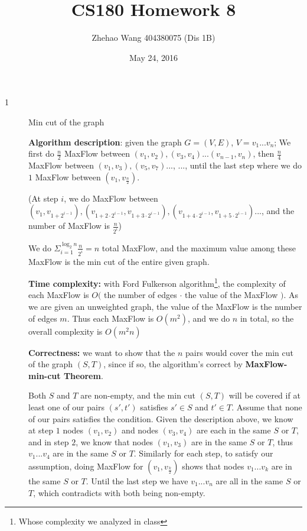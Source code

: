 \documentclass{article}
\title{CS180 Homework 8}
\author{Zhehao Wang 404380075 (Dis 1B)}
\date{May 24, 2016}
\begin{document}
\maketitle

\begin{description}

\item[1]{Min cut of the graph}
  
  \textbf{Algorithm description}: given the graph $G = (V, E)$, $V=v_1...v_n$; We first do $\frac{n}{2}$ MaxFlow between $(v_1, v_2), (v_3, v_4)...(v_{n-1}, v_n)$, then $\frac{n}{4}$ MaxFlow between $(v_1, v_3), (v_5, v_7)...$, ..., until the last step where we do $1$ MaxFlow between $(v_1, v_{\frac{n}{2}})$. 

  (At step $i$, we do MaxFlow between $(v_1, v_{1 + 2^{i - 1}}), (v_{1 + 2 \cdot 2^{i - 1}}, v_{1 + 3 \cdot 2^{i - 1}}), (v_{1 + 4 \cdot 2^{i - 1}}, v_{1 + 5 \cdot 2^{i - 1}})...$, and the number of MaxFlow is $\frac{n}{2^i}$)

  We do $\Sigma_{i=1}^{\log_{2}{n}}{\frac{n}{2^i}} = n$ total MaxFlow, and the maximum value among these MaxFlow is the min cut of the entire given graph.
  
  \textbf{Time complexity:} with Ford Fulkerson algorithm\footnote{Whose complexity we analyzed in class}, the complexity of each MaxFlow is $O($ the number of edges $\cdot$ the value of the MaxFlow $)$. As we are given an unweighted graph, the value of the MaxFlow is the number of edges $m$. Thus each MaxFlow is $O(m^2)$, and we do $n$ in total, so the overall complexity is $O(m^2 n)$

  \textbf{Correctness:} we want to show that the $n$ pairs would cover the min cut of the graph $(S, T)$, since if so, the algorithm's correct by \textbf{MaxFlow-min-cut Theorem}.

  Both $S$ and $T$ are non-empty, and the min cut $(S, T)$ will be covered if at least one of our pairs $(s', t')$ satisfies $s' \in S$ and $t' \in T$. Assume that none of our pairs satisfies the condition. Given the description above, we know at step $1$ nodes $(v_1, v_2)$ and nodes $(v_3, v_4)$ are each in the same $S$ or $T$, and in step $2$, we know that nodes $(v_1, v_3)$ are in the same $S$ or $T$, thus $v_1...v_4$ are in the same $S$ or $T$. Similarly for each step, to satisfy our assumption, doing MaxFlow for $(v_1, v_{\frac{k}{2}})$ shows that nodes $v_1...v_k$ are in the same $S$ or $T$. Until the last step we have $v_1...v_n$ are all in the same $S$ or $T$, which contradicts with both being non-empty. 


\end{description}
\end{document}
